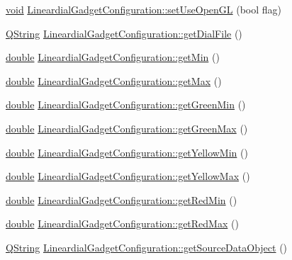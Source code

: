 \begin{DoxyCompactItemize}
\hyperlink{group___u_a_v_objects_plugin_ga444cf2ff3f0ecbe028adce838d373f5c}{void} \hyperlink{group___linear_dial_plugin_ga3834f5a345c01cce74297c2a65a82523}{Lineardial\-Gadget\-Configuration\-::set\-Use\-Open\-G\-L} (bool flag)
\item 
\hyperlink{group___u_a_v_objects_plugin_gab9d252f49c333c94a72f97ce3105a32d}{Q\-String} \hyperlink{group___linear_dial_plugin_ga44cbe980684b267ae41060c0428e00ce}{Lineardial\-Gadget\-Configuration\-::get\-Dial\-File} ()
\item 
\hyperlink{_super_l_u_support_8h_a8956b2b9f49bf918deed98379d159ca7}{double} \hyperlink{group___linear_dial_plugin_ga43b18753744079052cb3b4e58a226eab}{Lineardial\-Gadget\-Configuration\-::get\-Min} ()
\item 
\hyperlink{_super_l_u_support_8h_a8956b2b9f49bf918deed98379d159ca7}{double} \hyperlink{group___linear_dial_plugin_gae8b0681f133693a66256022babdca5cc}{Lineardial\-Gadget\-Configuration\-::get\-Max} ()
\item 
\hyperlink{_super_l_u_support_8h_a8956b2b9f49bf918deed98379d159ca7}{double} \hyperlink{group___linear_dial_plugin_gaac4e3bef42979801094f4b3c47d83a07}{Lineardial\-Gadget\-Configuration\-::get\-Green\-Min} ()
\item 
\hyperlink{_super_l_u_support_8h_a8956b2b9f49bf918deed98379d159ca7}{double} \hyperlink{group___linear_dial_plugin_gaf0f52dd07291d938390b228e8e0a90f2}{Lineardial\-Gadget\-Configuration\-::get\-Green\-Max} ()
\item 
\hyperlink{_super_l_u_support_8h_a8956b2b9f49bf918deed98379d159ca7}{double} \hyperlink{group___linear_dial_plugin_gad39b6746e6b3b7c0e6d20794d2f494d9}{Lineardial\-Gadget\-Configuration\-::get\-Yellow\-Min} ()
\item 
\hyperlink{_super_l_u_support_8h_a8956b2b9f49bf918deed98379d159ca7}{double} \hyperlink{group___linear_dial_plugin_ga2c58391f9aa712de50504d4437b54ded}{Lineardial\-Gadget\-Configuration\-::get\-Yellow\-Max} ()
\item 
\hyperlink{_super_l_u_support_8h_a8956b2b9f49bf918deed98379d159ca7}{double} \hyperlink{group___linear_dial_plugin_ga2144cb1d1c1c13bd87529460a3ad88bc}{Lineardial\-Gadget\-Configuration\-::get\-Red\-Min} ()
\item 
\hyperlink{_super_l_u_support_8h_a8956b2b9f49bf918deed98379d159ca7}{double} \hyperlink{group___linear_dial_plugin_ga022f5eeb2931bde01bb130ac6cb237b7}{Lineardial\-Gadget\-Configuration\-::get\-Red\-Max} ()
\item 
\hyperlink{group___u_a_v_objects_plugin_gab9d252f49c333c94a72f97ce3105a32d}{Q\-String} \hyperlink{group___linear_dial_plugin_ga6b635f5d74e7815014a597e5a38e5e80}{Lineardial\-Gadget\-Configuration\-::get\-Source\-Data\-Object} ()

\end{DoxyCompactItemize}
